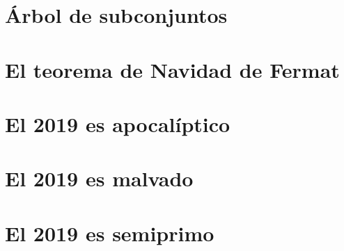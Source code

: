 \documentclass[a4paper,12pt,twoside]{book}
\begin{document}
\chapter{Árbol de subconjuntos}
\label{181228}


\chapter{El teorema de Navidad de Fermat}
\label{181231}

\chapter{El 2019 es apocalíptico}
\label{190101}

\chapter{El 2019 es malvado}
\label{190102}

\chapter{El 2019 es semiprimo}
\label{190103}


\end{document}

